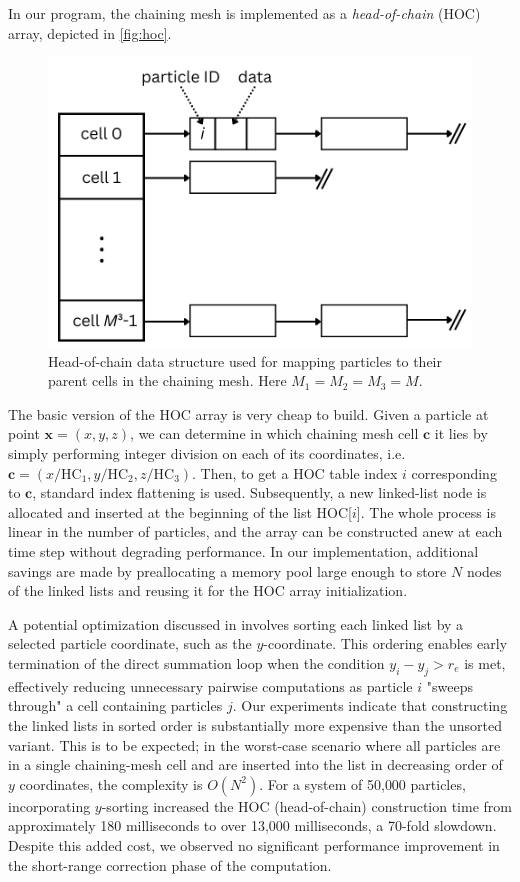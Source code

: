 In our program, the chaining mesh is implemented as a \textit{head-of-chain} (HOC) array, depicted in \autoref{fig:hoc}.
\begin{figure}[htp]
    \centering
    \includegraphics[scale=0.25]{chapters/p3m-method/img/hoc.png}
    \caption{Head-of-chain data structure used for mapping particles to their parent cells in the chaining mesh.
        Here $M_1=M_2=M_3 = M$.}
    \label{fig:hoc}
\end{figure}
The basic version of the HOC array is very cheap to build.
Given a particle at point $\mathbf{x} = (x, y, z)$, we can determine in which chaining mesh cell $\mathbf{c}$ it lies by simply performing integer division on each of its coordinates, i.e. $\mathbf{c} = (x / \text{HC}_1, y / \text{HC}_2, z / \text{HC}_3)$.
Then, to get a HOC table index $i$ corresponding to $\mathbf{c}$, standard index flattening is used.
Subsequently, a new linked-list node is allocated and inserted at the beginning of the list HOC[$i$].
The whole process is linear in the number of particles, and the array can be constructed anew at each time step without degrading performance.
In our implementation, additional savings are made by preallocating a memory pool large enough to store $N$ nodes of the linked lists and reusing it for the HOC array initialization.

A potential optimization discussed in \cite{Hockney1988} involves sorting each linked list by a selected particle coordinate, such as the $y$-coordinate.
This ordering enables early termination of the direct summation loop when the condition $y_i - y_j > r_e$ is met, effectively reducing unnecessary pairwise computations as particle $i$ "sweeps through" a cell containing particles $j$.
Our experiments indicate that constructing the linked lists in sorted order is substantially more expensive than the unsorted variant.
This is to be expected; in the worst-case scenario where all particles are in a single chaining-mesh cell and are inserted into the list in decreasing order of $y$ coordinates, the complexity is $O(N^2)$.
For a system of 50{,}000 particles, incorporating $y$-sorting increased the HOC (head-of-chain) construction time from approximately 180 milliseconds to over 13{,}000 milliseconds, a 70-fold slowdown.
Despite this added cost, we observed no significant performance improvement in the short-range correction phase of the computation.
